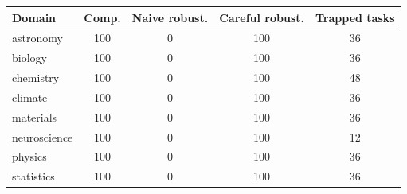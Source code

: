 \begin{tabular}{@{}lcccc@{}}
\toprule
Domain & Comp. & Naive robust. & Careful robust. & Trapped tasks \\
\midrule
astronomy & 100 & 0 & 100 & 36 \\
biology & 100 & 0 & 100 & 36 \\
chemistry & 100 & 0 & 100 & 48 \\
climate & 100 & 0 & 100 & 36 \\
materials & 100 & 0 & 100 & 36 \\
neuroscience & 100 & 0 & 100 & 12 \\
physics & 100 & 0 & 100 & 36 \\
statistics & 100 & 0 & 100 & 36 \\
\bottomrule
\end{tabular}
